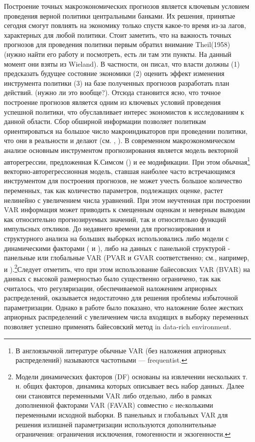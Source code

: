 \documentclass[11pt]{article} %
\begin{document}
Построение точных  макроэкономических прогнозов является ключевым условием проведения верной политики центральными  банками. Их решения, принятые сегодня смогут повлиять на экономику только спустя какое-то время из-за лагов, характерных для любой политики. Стоит заметить, что на важность точных прогнозов для проведения политики первым обратил внимание Theil(1958) (нужно найти его работу и посмотреть, есть ли там эти пункты. На данный момент они взяты из Wieland). В частности, он писал, что власти  должны (1) предсказать будущее состояние экономики (2) оценить эффект изменения инструмента политики (3) на базе полученных прогнозов разработать план действий. (нужно ли это вообще?). Отсюда становится ясно, что точное построение прогнозов является одним из ключевых условий проведения успешной политики, что обуславливает интерес экономистов к исследованиям к данной области. 
Сбор обширной информации позволяет политикам ориентироваться на большое число макроиндикаторов при проведении политики, что они в реальности и делают (см. \cite{beckner_1996}, \cite{bernanke_boivin_2003}).
В современном макроэкономическом анализе основным инструментом прогнозирования является модель векторной авторегрессии, предложенная К.Симсом (\cite{sims_1980}) и ее модификации.  При этом обычная\footnote{В англоязычной литературе обычные VAR (без наложения априорных распределений) называются частотными --- frequentist.} векторно-авторегрессионная модель, ставшая наиболее часто встречающимся инструментом для построения прогнозов, не может учесть большое количество переменных, так как количество параметров, подлежащих оценке, растет нелинейно с увеличением числа уравнений.  При этом неучтенная при построении VAR информация может приводить к смещенным оценкам и  неверным выводам  как относительно прогнозируемых значений, так и относительно функций импульсных откликов. До недавнего времени для прогнозирования и структурного анализа на больших выборках использовались либо модели с динамическими факторами (\cite{forni_al_2000} и \cite{stock_watson_2002}), либо на данных с панельной структурой - панельные или глобальные VAR (PVAR и GVAR соответственно; см., например,  \cite{pesaran_al_2004} и \cite{dees_guntner_2014}).\footnote{Модели динамических факторов (DF) основаны на извлечении нескольких т. н. общих факторов, динамика которых описывает весь набор данных.  Далее они становятся переменными VAR либо отдельно, либо в рамках дополненной факторами VAR (FAVAR) совместно c неcколькими переменными исходной выборки. В панельных и глобальных VAR для решения излишней параметризации используются дополнительные ограничения: ограничения исключения, гомогенности и экзогенности.}Следует отметить, что при этом использование байесовских VAR (BVAR) на данных с высокой размерностью было существенно ограничено, так как считалось, что регуляризации, обеспечиваемой наложением априорных распределений, оказывается недостаточно для решения проблемы избыточной параметризации. Однако в работе \cite{demol_al_2008} было показано, что наложение более жестких априорных распределений с увеличением числа входящих в выборку переменных позволяет успешно применять байесовский метод in data-rich environment. 
\end{document}
